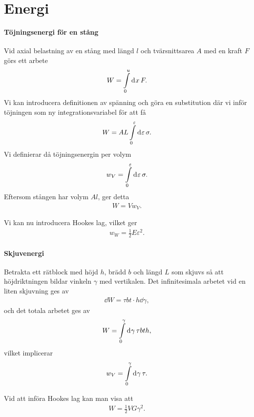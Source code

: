 \section{Energi}

\paragraph{Töjningsenergi för en stång}
Vid axial belastning av en stång med längd $l$ och tvärsnittsarea $A$ med en kraft $F$ görs ett arbete
\begin{align*}
	W = \int\limits_{0}^{u}\dd[]{x}F.
\end{align*}
Vi kan introducera definitionen av spänning och göra en substitution där vi inför töjningen som ny integrationsvariabel för att få
\begin{align*}
	W = AL\int\limits_{0}^{\varepsilon}\dd[]{\varepsilon}\sigma.
\end{align*}
Vi definierar då töjningsenergin per volym
\begin{align*}
	w_{V} = \int\limits_{0}^{\varepsilon}\dd[]{\varepsilon}\sigma.
\end{align*}
Eftersom stången har volym $Al$, ger detta
\begin{align*}
	W = Vw_{V}.
\end{align*}

Vi kan nu introducera Hookes lag, vilket ger
\begin{align*}
	w_{W} = \frac{1}{2}E\varepsilon^{2}.
\end{align*}

\paragraph{Skjuvenergi}
Betrakta ett rätblock med höjd $h$, brädd $b$ och längd $L$ som skjuvs så att höjdriktningen bildar vinkeln $\gamma$ med vertikalen. Det infinitesimala arbetet vid en liten skjuvning ges av
\begin{align*}
	\dd{W} = \tau bt\cdot h\dd{\gamma},
\end{align*}
och det totala arbetet ges av
\begin{align*}
	W = \int\limits_{0}^{\gamma}\dd[]{\gamma}\tau bth,
\end{align*}
vilket implicerar
\begin{align*}
	w_{V} = \int\limits_{0}^{\gamma}\dd[]{\gamma}\tau.
\end{align*}

Vid att införa Hookes lag kan man visa att
\begin{align*}
	W = \frac{1}{2}VG\gamma^{2}.
\end{align*}


